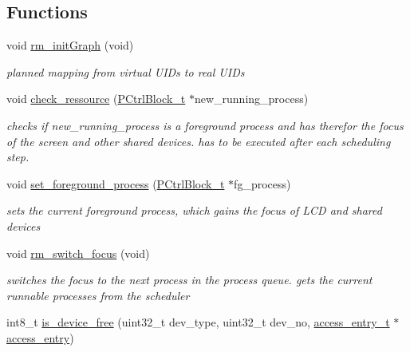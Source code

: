 \subsection*{Functions}
\begin{CompactItemize}
\item 
void \hyperlink{group___r_e_s_o_u_r_c_e___m_g521d6b7564e57ef0d80abea4b53d6c7f}{rm\_\-initGraph} (void)
\begin{CompactList}\small\item\em planned mapping from virtual UIDs to real UIDs \item\end{CompactList}\item 
void \hyperlink{group___r_e_s_o_u_r_c_e___m_g5d470ccb4591d7168916467ba0b93b20}{check\_\-ressource} (\hyperlink{structprocess_control_block}{PCtrlBlock\_\-t} $\ast$new\_\-running\_\-process)
\begin{CompactList}\small\item\em checks if new\_\-running\_\-process is a foreground process and has therefor the focus of the screen and other shared devices. has to be executed after each scheduling step. \item\end{CompactList}\item 
void \hyperlink{group___r_e_s_o_u_r_c_e___m_gb922966b175c37acd17f1152c188b987}{set\_\-foreground\_\-process} (\hyperlink{structprocess_control_block}{PCtrlBlock\_\-t} $\ast$fg\_\-process)
\begin{CompactList}\small\item\em sets the current foreground process, which gains the focus of LCD and shared devices \item\end{CompactList}\item 
\hypertarget{group___r_e_s_o_u_r_c_e___m_g21c7d1f374d3089ecb525e56076cf0b5}{
void \hyperlink{group___r_e_s_o_u_r_c_e___m_g21c7d1f374d3089ecb525e56076cf0b5}{rm\_\-switch\_\-focus} (void)}
\label{group___r_e_s_o_u_r_c_e___m_g21c7d1f374d3089ecb525e56076cf0b5}

\begin{CompactList}\small\item\em switches the focus to the next process in the process queue. gets the current runnable processes from the scheduler \item\end{CompactList}\item 
\hypertarget{group___r_e_s_o_u_r_c_e___m_g64d5ef2dd419a49cf59542a4b954af41}{
int8\_\-t \hyperlink{group___r_e_s_o_u_r_c_e___m_g64d5ef2dd419a49cf59542a4b954af41}{is\_\-device\_\-free} (uint32\_\-t dev\_\-type, uint32\_\-t dev\_\-no, \hyperlink{structaccess__entry}{access\_\-entry\_\-t} $\ast$\hyperlink{structaccess__entry}{access\_\-entry})}
\label{group___r_e_s_o_u_r_c_e___m_g64d5ef2dd419a49cf59542a4b954af41}


\end{CompactItemize}
